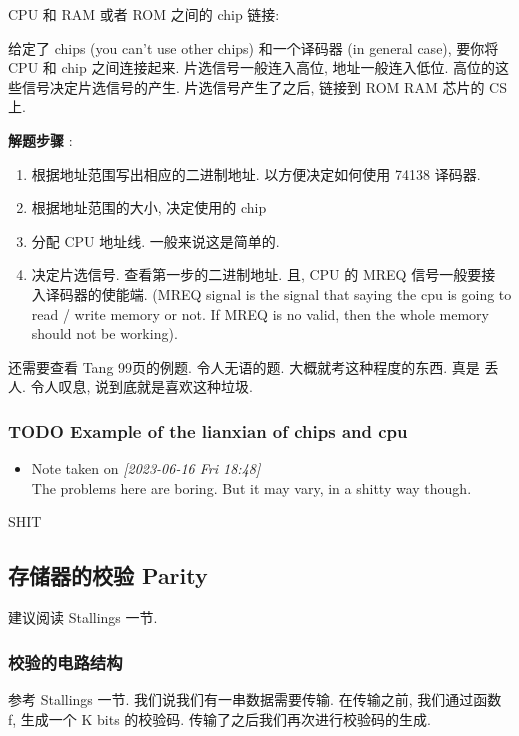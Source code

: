 \documentclass[11pt]{article}
\begin{document}
CPU 和 RAM 或者 ROM 之间的 chip 链接:

给定了 chips (you can't use other chips) 和一个译码器 (in general case), 要你将 CPU 和 chip 之间连接起来.  片选信号一般连入高位, 地址一般连入低位. 高位的这些信号决定片选信号的产生. 片选信号产生了之后, 链接到 ROM RAM 芯片的 CS 上.

\textbf{解题步骤} :
\begin{enumerate}
\item 根据地址范围写出相应的二进制地址. 以方便决定如何使用 74138 译码器.
\item 根据地址范围的大小, 决定使用的 chip
\item 分配 CPU 地址线. 一般来说这是简单的.
\item 决定片选信号. 查看第一步的二进制地址. 且, CPU 的 MREQ 信号一般要接
入译码器的使能端. (MREQ signal is the signal that saying the cpu is going to read / write memory or not. If MREQ is no valid, then the whole memory should not be working).
\end{enumerate}

还需要查看 Tang 99页的例题. 令人无语的题. 大概就考这种程度的东西. 真是
丢人. 令人叹息, 说到底就是喜欢这种垃圾.

\subsubsection{{\bfseries\sffamily TODO} Example of the lianxian of chips and cpu}
\label{sec:orgfbfdc54}
\begin{itemize}
\item Note taken on \textit{[2023-06-16 Fri 18:48] } \\
The problems here are boring. But it may vary, in a shitty way though.
\end{itemize}

SHIT
\subsection{存储器的校验 Parity}
\label{sec:org95dc815}

建议阅读 Stallings 一节.

\subsubsection{校验的电路结构}
\label{sec:org40b03cb}

参考 Stallings 一节. 我们说我们有一串数据需要传输. 在传输之前, 我们通过函数 f, 生成一个 K bits 的校验码. 传输了之后我们再次进行校验码的生成.
\end{document}
